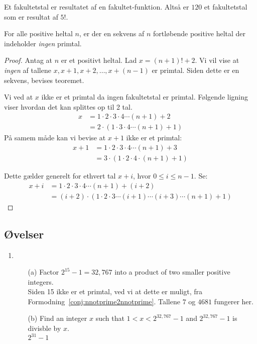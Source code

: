 \begin{definition}[Fakultetstal]
Et fakultetstal er resultatet af en fakultet-funktion. Altså er $120$ et fakultetstal som er resultat af $5!$.
\end{definition}

\begin{theorem}
For alle positive heltal $n$, er der en sekvens af $n$ fortløbende positive heltal der indeholder \textit{ingen} primtal.
\end{theorem}

\begin{proof}
  Antag at $n$ er et positivt heltal. Lad $x = (n+1)!+2$. Vi vil vise at \textit{ingen} af tallene $x, x+1, x+2, \ldots, x+(n-1)$ er primtal. Siden dette er en sekvens, bevises teoremet.

  Vi ved at $x$ ikke er et primtal da ingen fakultetstal er primtal. Følgende ligning viser hvordan det kan splittes op til 2 tal.
  \begin{align*}
    x &=  1 \cdot 2 \cdot 3 \cdot 4 \cdots (n+1)+2 \\
    &= 2 \cdot (1 \cdot 3 \cdot 4 \cdots (n+1)+1)
  \end{align*}
  På samem måde kan vi bevise at $x + 1$ ikke er et primtal:
  \begin{align*}
    x+1 &= 1 \cdot 2 \cdot 3 \cdot 4 \cdots (n+1)+3\\
    &= 3 \cdot (1 \cdot 2 \cdot 4 \cdot (n+1)+1)
  \end{align*}

  Dette gælder generelt for ethvert tal $x + i$, hvor $0 \le i \le n-1$. Se:
  \begin{align*}
    x+i &= 1 \cdot 2 \cdot 3 \cdot 4 \cdots (n+1) + (i+2)\\
    &= (i+2) \cdot (1 \cdot 2 \cdot 3 \cdots (i+1) \cdots (i+3) \cdots (n+1)+1)
  \end{align*}

\end{proof}

\subsection{Øvelser}%
\label{subsec:0exercises}

\begin{enumerate}
  \item
        \begin{enumerate}
          \item[(a)] Factor $2^{15}-1 = 32,767$ into a product of two smaller positive integers.\\
                \noindent
                Siden 15 ikke er et primtal, ved vi at dette er muligt, fra Formodning~\ref{conj:nnotprime2nnotprime}. Tallene $7$ og $4681$ fungerer her.
          \item[(b)] Find an integer $x$ such that $1 < x < 2^{32,767}-1$ and $2^{32,767}-1$ is divisble by $x$.\\
                \noindent
                $2^{31}-1$
        \end{enumerate}
\end{enumerate}




